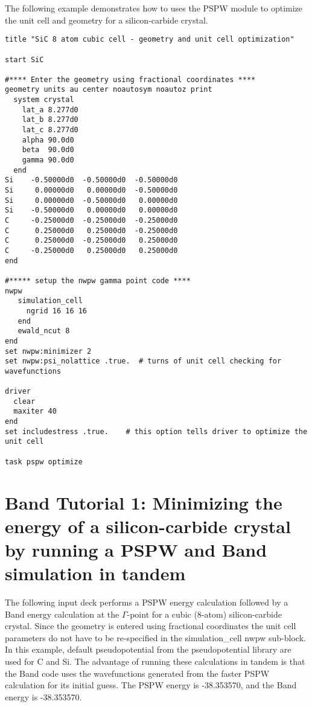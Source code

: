 The following example demonstrates how to uses the PSPW module to optimize the unit cell
and geometry for a silicon-carbide crystal.

\begin{verbatim}
title "SiC 8 atom cubic cell - geometry and unit cell optimization"

start SiC

#**** Enter the geometry using fractional coordinates ****
geometry units au center noautosym noautoz print
  system crystal
    lat_a 8.277d0
    lat_b 8.277d0
    lat_c 8.277d0
    alpha 90.0d0
    beta  90.0d0
    gamma 90.0d0
  end
Si    -0.50000d0  -0.50000d0  -0.50000d0
Si     0.00000d0   0.00000d0  -0.50000d0
Si     0.00000d0  -0.50000d0   0.00000d0
Si    -0.50000d0   0.00000d0   0.00000d0
C     -0.25000d0  -0.25000d0  -0.25000d0
C      0.25000d0   0.25000d0  -0.25000d0
C      0.25000d0  -0.25000d0   0.25000d0
C     -0.25000d0   0.25000d0   0.25000d0
end

#***** setup the nwpw gamma point code ****
nwpw
   simulation_cell
     ngrid 16 16 16
   end
   ewald_ncut 8
end
set nwpw:minimizer 2
set nwpw:psi_nolattice .true.  # turns of unit cell checking for wavefunctions

driver
  clear
  maxiter 40
end
set includestress .true.    # this option tells driver to optimize the unit cell

task pspw optimize

\end{verbatim}




\normalsize
\section{Band Tutorial 1: Minimizing the energy of a silicon-carbide crystal by running a PSPW and Band simulation in tandem}
\label{sec:band_tutorial1}
\normalsize

The following input deck performs a PSPW energy calculation followed
by a Band energy calculation at the $\Gamma$-point  for a cubic (8-atom) 
silicon-carbide crystal.  Since the geometry is entered using fractional coordinates
the unit cell parameters do not have to be re-specified in the simulation\_cell
nwpw sub-block.  In this example, default pseudopotential from the pseudopotential
library are used for C and Si.  The advantage of running these calculations in tandem is that
the Band code uses the wavefunctions generated from the faster PSPW calculation for
its initial guess.  The PSPW energy is -38.353570, and the Band energy is -38.353570.
 
